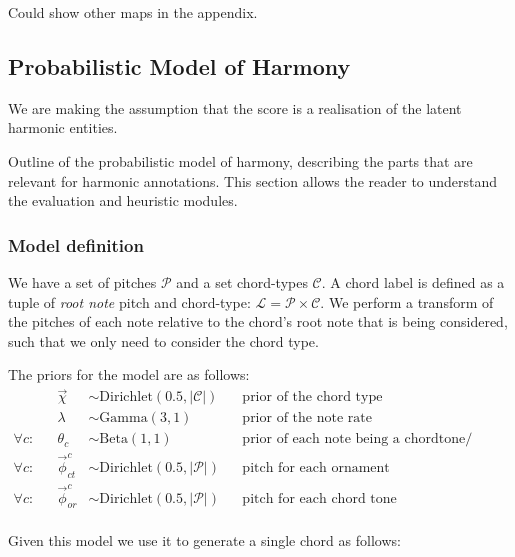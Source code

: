 \documentclass[12pt,a4paper,twoside,openright]{report}
\theoremstyle{definition}
\begin{document}
\par 
Could show other maps in the appendix.


\FloatBarrier
\subsection{Probabilistic Model of Harmony}
We are making the assumption that the score is a realisation of the latent harmonic entities. 

Outline of the probabilistic model of harmony, describing the parts that are relevant for harmonic annotations. This section allows the reader to understand the evaluation and heuristic modules.

\subsubsection{Model definition}
We have a set of pitches $\mathcal{P}$ and a set chord-types $\mathcal{C}$. A chord label is defined as a tuple of \textit{root note} pitch and chord-type: $\mathcal{L} = \mathcal{P} \times \mathcal{C}$. We perform a transform of the pitches of each note relative to the chord's root note that is being considered, such that we only need to consider the chord type. 

\par
The priors for the model are as follows:
\begin{equation}
\begin{align*} 
              && \vec{\chi} &\sim \text{Dirichlet}(0.5, |\mathcal{C}|)     && \text{prior of the chord type} \\
              && \lambda &\sim \text{Gamma}(3, 1)     && \text{prior of the note rate} \\
  \forall c:  && \theta_c  &\sim \text{Beta}(1, 1)        && \text{prior of each note being a chordtone/ ornament} \\
  \forall c:  && \vec{\phi}_{ct}^{c}  &\sim \text{Dirichlet}(0.5, |\mathcal{P}|)        && \text{pitch for each ornament} \\
  \forall c:  && \vec{\phi}_{or}^{c}  &\sim \text{Dirichlet}(0.5, |\mathcal{P}|)        && \text{pitch for each chord tone} \\
\end{align*}
\label{eq:phm}
\end{equation}
\par 
Given this model we use it to generate a single chord as follows:
\end{document}
